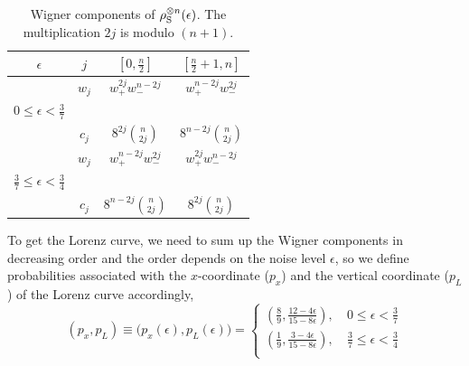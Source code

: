 \documentclass[pra,
aps,
twocolumn,
superscriptaddress,
groupedaddress,
nofootinbib,
reprint
]{revtex4-1}
\begin{document}
\begin{table}[t]                           
 \centering
 \begin{tabular}{c|c|c|c}
 $\epsilon$ & $j$ & $\left[0, \frac{n}{2}\right]$ & $\left[\frac{n}{2} + 1, n \right]$ \\ [0.5ex] 
 \hline
  & $w_{j}$ & $w_+^{2j}w_-^{n-2j}$ & $w_+^{n-2j}w_-^{2j}$  \\
  $0\leq \epsilon < \frac{3}{7}$ & & & \\
  & $c_{j}$ & $8^{2j}\binom{n}{2j}$ & $8^{n-2j}\binom{n}{2j}$ \\
 \hline
  & $w_{j}$ & $w_+^{n-2j}w_-^{2j}$ & $w_+^{2j}w_-^{n-2j}$  \\
  $\frac{3}{7} \leq \epsilon < \frac{3}{4} $ & & & \\
  & $c_{j}$ & $8^{n-2j}\binom{n}{2j}$ & $8^{2j}\binom{n}{2j}$
\end{tabular}
 \caption{Wigner components of $\rho_{\rm{S}}^{\otimes n}(\epsilon)$. The multiplication $2j$ is modulo $(n+1)$.}
 \label{tab:lcsu_w}
\end{table}

To get the Lorenz curve, we need to sum up the Wigner components in decreasing order and the order depends on the noise level $\epsilon$, so we define probabilities associated with the $x$-coordinate ($p_x$) and the vertical coordinate ($p_L$) of the Lorenz curve accordingly,
\begin{equation}
	(p_x, p_L) \equiv \big( p_x(\epsilon), p_L(\epsilon) \big) = 
	\begin{cases}
		\left( \frac{8}{9}, \frac{12-4\epsilon}{15-8\epsilon} \right),\ & 0\leq \epsilon < \frac{3}{7} \\
		\left( \frac{1}{9}, \frac{3-4\epsilon}{15-8\epsilon} \right),\ & \frac{3}{7}\leq \epsilon < \frac{3}{4} \\
	\end{cases}	
\end{equation}
\end{document}
